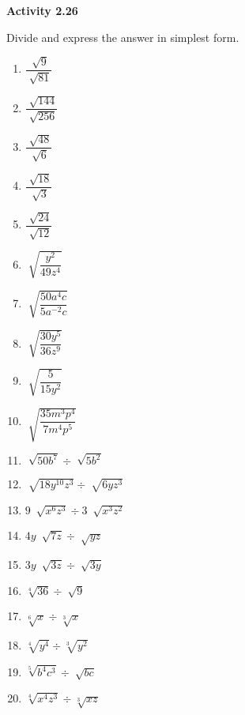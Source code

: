 \vspace{0.3ex}
\noindent\textbf{Activity 2.26}

\vspace{0.2ex}

Divide and express the answer in simplest form.

\begin{multicols}{3}
\begin{enumerate}[noitemsep, label = \color{blue}\arabic*. ]
    \item \(\dfrac{\sqrt[]{9}}{\sqrt[]{81}}\)
    \item \(\dfrac{\sqrt[]{144}}{\sqrt[]{256}}\)
    \item \(\dfrac{\sqrt[]{48}}{\sqrt[]{6}}\)
    \item \(\dfrac{\sqrt[]{18}}{\sqrt[]{3}}\)
    \item \(\dfrac{\sqrt[]{24}}{\sqrt[]{12}}\)
    \item \(\sqrt[]{\dfrac{y^{2}}{49z^{4}}}\)
    \item \(\sqrt[]{\dfrac{50a^{4}c}{5a^{-2}c}}\)
    \item \(\sqrt[]{\dfrac{30y^{5}}{36z^{9}}}\)
    \item \(\sqrt[]{\dfrac{5}{15y^{2}}}\)
    \item \(\sqrt[]{\dfrac{35m^{3}p^{4}}{7m^{4}p^{5}}}\)
    \item \(\sqrt[]{50b^{7}} \div \sqrt[]{5b^{2}}\)
    \item \(\sqrt[]{18y^{10}z^{3}} \div \sqrt[]{6yz^{3}}\)
    \item \(9~\sqrt[]{x^{6}z^{3}} \div 3~\sqrt[]{x^{3}z^{2}}\)
    \item \(4y~\sqrt[]{7z} \div \sqrt[]{yz}\)
    \item \(3y~\sqrt[]{3z} \div \sqrt[]{3y}\)
    \item \(\sqrt[{\scriptstyle 4}]{36} \div \sqrt[]{9}\)
    \item \(\sqrt[{\scriptstyle 6}]{x} \div \sqrt[{\scriptstyle 3}]{x}\)
    \item \(\sqrt[{\scriptstyle 4}]{y^{4}} \div \sqrt[{\scriptstyle 3}]{y^{2}}\)
    \item \(\sqrt[{\scriptstyle 5}]{b^{4}c^{3}} \div \sqrt[]{bc}\)
    \item \(\sqrt[{\scriptstyle 4}]{x^{4}z^{3}} \div \sqrt[{\scriptstyle 3}]{xz}\)
\end{enumerate}
\end{multicols}


